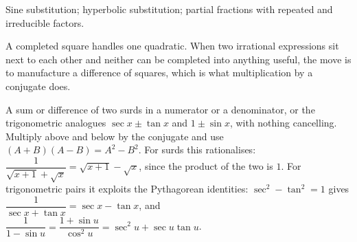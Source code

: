\begin{seealsob}Sine substitution; hyperbolic substitution; partial fractions with repeated and irreducible factors.\end{seealsob}

A completed square handles one quadratic. When two irrational expressions sit next to each other and neither can be completed into anything useful, the move is to manufacture a difference of squares, which is what multiplication by a conjugate does.

\cue A sum or difference of two surds in a numerator or a denominator, or the trigonometric analogues $\sec x\pm\tan x$ and $1\pm\sin x$, with nothing cancelling.
\method Multiply above and below by the conjugate and use $(A+B)(A-B)=A^2-B^2$. For surds this rationalises: $\dfrac{1}{\sqrt{x+1}+\sqrt x}=\sqrt{x+1}-\sqrt x$, since the product of the two is $1$. For trigonometric pairs it exploits the Pythagorean identities: $\sec^2-\tan^2=1$ gives $\dfrac{1}{\sec x+\tan x}=\sec x-\tan x$, and $\dfrac{1}{1-\sin u}=\dfrac{1+\sin u}{\cos^2u}=\sec^2u+\sec u\tan u$.


